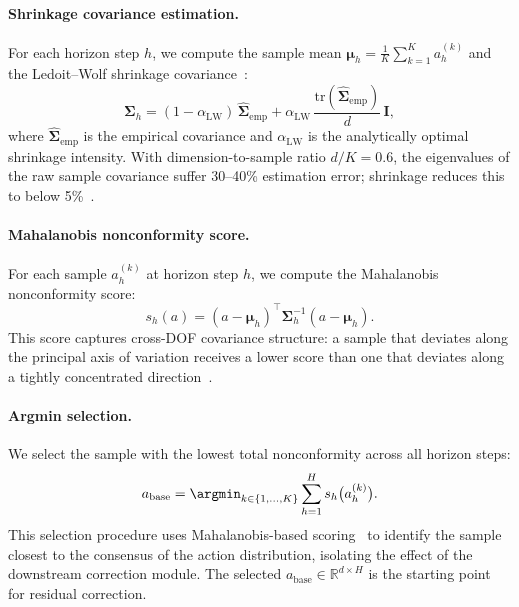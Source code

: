 \paragraph{Shrinkage covariance estimation.}
For each horizon step $h$, we compute the sample mean $\boldsymbol{\mu}_h = \frac{1}{K}\sum_{k=1}^K a_h^{(k)}$ and the Ledoit--Wolf shrinkage covariance~\cite{ledoit2004well}:
\begin{equation}
  \boldsymbol{\Sigma}_h = (1 - \alpha_{\mathrm{LW}})\,\hat{\boldsymbol{\Sigma}}_{\mathrm{emp}} + \alpha_{\mathrm{LW}}\,\frac{\mathrm{tr}(\hat{\boldsymbol{\Sigma}}_{\mathrm{emp}})}{d}\,\mathbf{I},
  \label{eq:shrinkage}
\end{equation}
where $\hat{\boldsymbol{\Sigma}}_{\mathrm{emp}}$ is the empirical covariance and $\alpha_{\mathrm{LW}}$ is the analytically optimal shrinkage intensity. With dimension-to-sample ratio $d/K = 0.6$, the eigenvalues of the raw sample covariance suffer 30--40\% estimation error; shrinkage reduces this to below 5\%~\cite{ledoit2004well}.

\paragraph{Mahalanobis nonconformity score.}
For each sample $a_h^{(k)}$ at horizon step $h$, we compute the Mahalanobis nonconformity score:
\begin{equation}
  s_h(a) = (a - \boldsymbol{\mu}_h)^\top \boldsymbol{\Sigma}_h^{-1} (a - \boldsymbol{\mu}_h).
  \label{eq:mahal}
\end{equation}
This score captures cross-DOF covariance structure: a sample that deviates along the principal axis of variation receives a lower score than one that deviates along a tightly concentrated direction~\cite{braun2025cgs}.

\paragraph{Argmin selection.}
We select the sample with the lowest total nonconformity across all horizon steps:
\begin{equation}
  a_{\mathrm{base}} = \argmin_{k \in \{1,\dots,K\}} \sum_{h=1}^{H} s_h\bigl(a_h^{(k)}\bigr).
  \label{eq:argmin}
\end{equation}
This selection procedure uses Mahalanobis-based scoring~\cite{braun2025cgs} to identify the sample closest to the consensus of the action distribution, isolating the effect of the downstream correction module. The selected $a_{\mathrm{base}} \in \mathbb{R}^{d \times H}$ is the starting point for residual correction.

